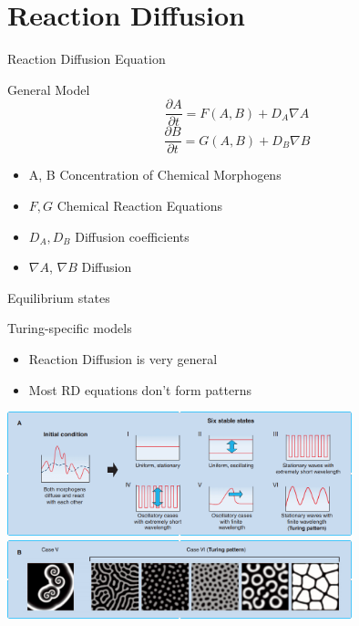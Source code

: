 \documentclass[t,10pt,fleqn]{beamer}
\begin{document}
\section{Reaction Diffusion}
\begin{frame}{Reaction Diffusion Equation}
  \vspace{-.3cm}
  \begin{block}{General Model}
      $$\frac{\partial A}{\partial t} = F(A,B) + D_{A} \nabla A$$
      $$\frac{\partial B}{\partial t} = G(A,B) + D_{B} \nabla B$$
      \pause
    \begin{itemize}
      \item A, B Concentration of Chemical Morphogens
      \pause
      \item $F, G$ Chemical Reaction Equations
      \pause
      \item $D_{A}, D_{B}$ Diffusion coefficients
      \pause
      \item $\nabla A$, $\nabla B$ Diffusion
      \pause
    \end{itemize}
  \end{block}
  \pause
\end{frame}

\begin{frame}{Equilibrium states}
  \vspace{-.3cm}
  \begin{block}{Turing-specific models}
    \begin{itemize}
      \item Reaction Diffusion is very general
      \pause
      \item Most RD equations don't form patterns
      \pause
    \end{itemize}
      \includegraphics[width=0.75\textwidth]{stable_states.png}\\
      \pause
      \includegraphics[width=0.75\textwidth]{turing_pattern.png}
  \end{block}
  \pause
\end{frame}
\end{document}
